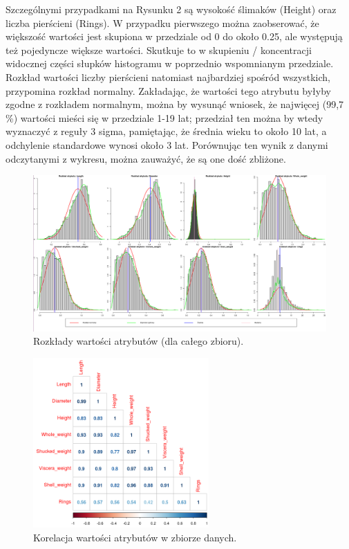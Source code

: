 \documentclass{scrartcl}
\begin{document}
  Szczególnymi przypadkami na Rysunku 2 są wysokość ślimaków (Height) 
  oraz liczba pierścieni (Rings). W przypadku pierwszego można zaobserować,
  że większość wartości jest skupiona w przedziale od 0 do około 0.25, ale
  występują też pojedyncze większe wartości. Skutkuje to w skupieniu / koncentracji
  widocznej części słupków histogramu w poprzednio wspomnianym przedziale. Rozkład
  wartości liczby pierścieni natomiast najbardziej spośród wszystkich, przypomina
  rozkład normalny. Zakładając, że wartości tego atrybutu byłyby zgodne z rozkładem
  normalnym, można by wysunąć wniosek, że najwięcej (99,7 \%) wartości mieści się
  w przedziale 1-19 lat; przedział ten można by wtedy wyznaczyć z reguły 3 sigma, 
  pamiętając, że średnia wieku to około 10 lat, a odchylenie standardowe wynosi 
  około 3 lat. Porównując ten wynik z danymi odczytanymi z wykresu, można zauważyć,
  że są one dość zbliżone.

  \begin{figure}[H]
    \center
    \includegraphics[width=\textwidth]{plots/histograms_full.png}
    \caption{Rozkłady wartości atrybutów (dla całego zbioru).}
  \end{figure}

  \begin{figure}[H]
    \center
    \includegraphics[width=0.6\textwidth]{plots/correlations.png}
    \caption{Korelacja wartości atrybutów w zbiorze danych.}
  \end{figure}
\end{document}
